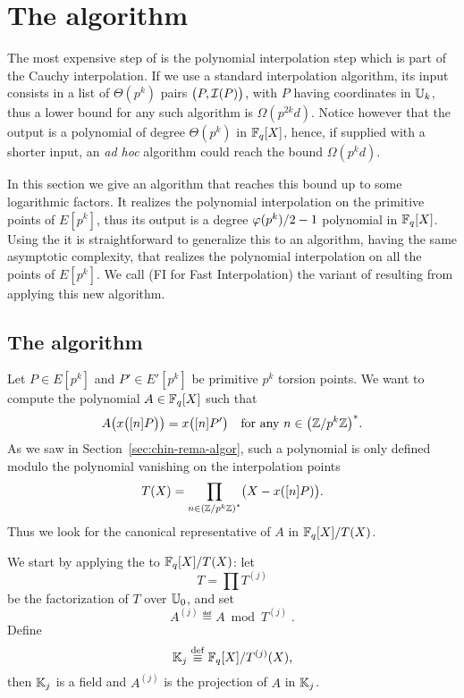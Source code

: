 \section{The algorithm }
\label{sec:C2-AS-FI}

The most expensive step of \ctwoas{} is the polynomial interpolation step
which is part of the Cauchy interpolation. If we use a standard
interpolation algorithm, its input consists in a list of $\Theta(p^k)$
pairs $\bigl(P, \mathcal{I}(P)\bigr)$, with $P$ having coordinates in $\mathbb{U}_k$,
thus a lower bound for any such algorithm is $\Omega(p^{2k}d)$. Notice
however that the output is a polynomial of degree $\Theta(p^k)$ in
$\mathbb{F}_q[X]$, hence, if supplied with a shorter input, an \emph{ad hoc}
algorithm could reach the bound $\Omega(p^kd)$.

In this section we give an algorithm that reaches this bound up to
some logarithmic factors. It realizes the polynomial interpolation on
the primitive points of $E[p^k]$, thus its output is a degree
$\varphi(p^k)/2-1$ polynomial in $\mathbb{F}_q[X]$. Using the
 it is straightforward to generalize
this to an algorithm, having the same asymptotic complexity, that
realizes the polynomial interpolation on all the points of
$E[p^k]$. We call \ctwoasfi{} (FI for Fast Interpolation) the variant of
\ctwoas{} resulting from applying this new algorithm.


\subsection{The algorithm}
Let $P\in E[p^k]$ and $P'\in E'[p^k]$ be primitive $p^k$ torsion
points. We want to compute the polynomial $A\in\mathbb{F}_q[X]$ such that
\begin{equation}
  A\bigl(x\bigl([n]P\bigr)\bigr) = x\bigl([n]P'\bigr)
  \quad\text{for any $n\in\left(\mathbb{Z}/p^k\mathbb{Z}\right)^\ast$.}
\end{equation}
As we saw in Section~\ref{sec:chin-rema-algor}, such a polynomial is
only defined modulo the polynomial vanishing on the interpolation
points
\begin{equation}
  T(X) = \prod_{n\in\left(\mathbb{Z}/p^k\mathbb{Z}\right)^\ast} \bigl(X - x([n]P)\bigr)
  \text{.}
\end{equation}
Thus we look for the canonical representative of $A$ in $\mathbb{F}_q[X]/T(X)$.

We start by applying the  to
$\mathbb{F}_q[X]/T(X)$: let
\begin{equation}
  \label{eq:T}
  T = \prod T^{(j)}
\end{equation}
be the factorization of $T$ over $\mathbb{U}_0$, and set
\begin{equation}
  \label{eq:A}
  A^{(j)} \eqdef A \bmod T^{(j)}
  \;\text{.}
\end{equation}
Define
\begin{equation}
  \label{eq:187}
  \mathbb{K}_j\overset{\mathrm{def}}{\equiv}\mathbb{F}_q[X]/T^{(j)}(X)  
  \text{,}
\end{equation}
then $\mathbb{K}_j$ is a field and $A^{(j)}$ is the projection of $A$ in
$\mathbb{K}_j$.

